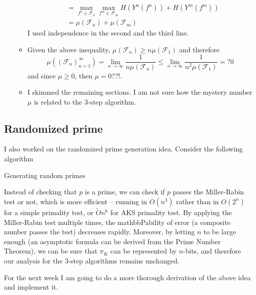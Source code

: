 \documentclass{article}
\begin{document}
\begin{itemize}
\begin{itemize}
\begin{align*}
			                                     & = \max_{f^{n} \in \mathcal{F}_n} \max_{f^m \in \mathcal{F}_m } H(Y^{n }(f^{n}) )+ H( Y^m(f^m)) \\
			                                     & = \mu(\mathcal{F}_n) + \mu(\mathcal{F}_m)
		            \end{align*}
		            I used independence in the second and the third line.
		      \item Given the above inequality, \(\mu(\mathcal{F}_n) \geq n \mu(\mathcal{F}_1)\) and therefore
		            \begin{equation*}
			            \mu((\mathcal{F}_n)_{n = 1}^{\infty}) = \lim_{n \to \infty} \dfrac{1}{n \mu(\mathcal{F}_{n})} \leq \lim_{n \to \infty} \dfrac{1}{n^2 \mu(\mathcal{F}_{1})} =? 0
		            \end{equation*}
		            and since \(\mu \geq 0\), then \(\mu = 0\)??!.
		      \item I skimmed the remaining sections. I am not sure how the mystery number \(\mu\) is related to the 3-step algorithm.
	      \end{itemize}
\end{itemize}
\subsection{Randomized prime}
I also worked on the randomized prime generation idea. Consider the following algorithm
\begin{algorithm}
	\DontPrintSemicolon
	\Return{\(\perp\)}
	\caption{Generating random primes}
\end{algorithm}
Instead of checking that \(p\) is a prime, we can check if \(p\) passes the Miller-Rabin test or not, which is more efficient -- running in \(O(n^3)\) rather than in \(O(2^n)\) for a simple primality test, or \(\tilde{O}{n^6}\) for AKS primality test. By applying the Miller-Rabin test multiple times, the mathbb{P}ability of error (a composite number passes the test) decreases rapidly. Moreover, by letting \(n\) to be large enough (an asymptotic formula can be derived from the Prime Number Theorem), we can be sure that \(\pi_K\) can be represented by \(n\)-bits, and therefore our analysis for the 3-step algorithms remains unchanged.

For the next week I am going to do a more thorough derivation of the above idea and implement it.
\end{document}
